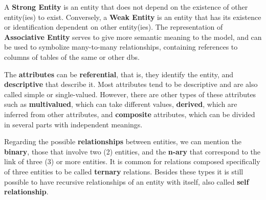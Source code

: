 A \textbf{Strong Entity} is an entity that does not depend on the existence of other entity(ies) to exist.
Conversely, a \textbf{Weak Entity} is an entity that has its existence or identification dependent on other entity(ies).
The representation of \textbf{Associative Entity} serves to give more semantic meaning to the model, and can be used to symbolize many-to-many relationships, containing references to columns of tables of the same or other \acp{db}.

The \textbf{attributes} can be \textbf{referential}, that is, they identify the entity, and \textbf{descriptive} that describe it.
Most attributes tend to be descriptive and are also called simple or single-valued.
However, there are other types of these attributes such as \textbf{multivalued}, which can take different values, \textbf{derived}, which are inferred from other attributes, and \textbf{composite} attributes, which can be divided in several parts with independent meanings.

Regarding the possible \textbf{relationships} between entities, we can mention the \textbf{binary}, those that involve two (2) entities, and the \textbf{n-ary} that correspond to the link of three (3) or more entities.
It is common for relations composed specifically of three entities to be called \textbf{ternary} relations.
Besides these types it is still possible to have recursive relationships of an entity with itself, also called \textbf{self relationship}.

